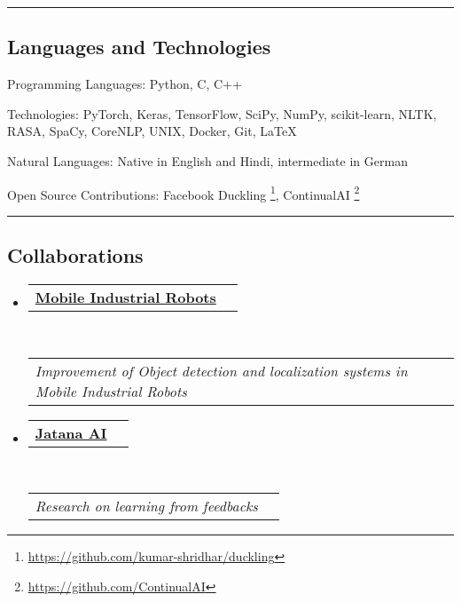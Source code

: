 \documentclass[10pt,letterpaper]{article}
\makeatletter
\newenvironment{indentsection}[1]%
{\begin{list}{}%
	{\setlength{\leftmargin}{#1}}%
	\item[]%
}
{\end{list}}
\newcommand{\headerrow}[2]
{\begin{tabular*}{\linewidth}{l@{\extracolsep{\fill}}r}
	#1 &
	#2 \\
\end{tabular*}}
\makeatother
\begin{document}
\hrule
\vspace{-0.4em}
\subsection*{Languages and Technologies}

\begin{indentsection}{\parindent}
\begin{description*}
	\item[Programming Languages:]
	Python, C, C++
	\item[Technologies:]
	PyTorch, Keras, TensorFlow, SciPy, NumPy, scikit-learn, NLTK, RASA, SpaCy, CoreNLP, UNIX, Docker, Git, \LaTeX
	\item[Natural Languages:]
	Native in English and Hindi, intermediate in German	
	\item[Open Source Contributions:]
	Facebook Duckling \footnote{\url{ https://github.com/kumar-shridhar/duckling}}, ContinualAI \footnote{\url{https://github.com/ContinualAI}}
\end{description*}
\end{indentsection}

\hrule
\vspace{-0.4em}
\subsection*{Collaborations}

\begin{itemize}
	\parskip=0.1em
	
	\item 
	\headerrow
		{\textbf{\href{http://www.mobile-industrial-robots.com/en/}{Mobile Industrial Robots}}}
			{\textbf{}}
	\\
	\headerrow
		{\emph{Improvement of Object detection and localization systems in Mobile Industrial Robots}}
		{\emph{}}
	
    	\item 
	\headerrow
		{\textbf{\href{https://www.jatana.ai/}{Jatana AI}}}
			{\textbf{}}
	\\
	\headerrow
		{\emph{Research on learning from feedbacks}}
		{\emph{}}
	
\end{itemize}
\end{document}
